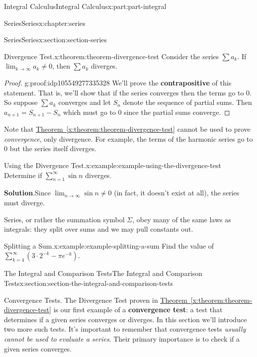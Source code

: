 \documentclass[twoside,10pt,]{book}
\newcommand{\blocktitlefont}{\relax}
\newcommand{\xreffont}{\relax}
\newcommand{\terminology}[1]{\textbf{#1}}
\numberwithin{equation}{part}
\begin{document}
\begin{partptx}{Integral Calculus}{}{Integral Calculus}{}{}{x:part:part-integral}
\begin{chapterptx}{Series}{}{Series}{}{}{x:chapter:series}
\begin{sectionptx}{Series}{}{Series}{}{}{x:section:section-series}
\begin{theorem}{Divergence Test.}{}{x:theorem:theorem-divergence-test}%
Consider the series \(\sum a_{k}\). If \(\lim_{k\to\infty}a_{k}\neq0\), then \(\sum a_{k}\) diverges.%
\end{theorem}
\begin{proof}{}{g:proof:idp105549277335328}
We'll prove the \terminology{contrapositive} of this statement. That is, we'll show that if the series converges then the terms go to \(0\). So suppose \(\sum a_{k}\) converges and let \(S_{n}\) denote the sequence of partial sums. Then \(a_{n+1} = S_{n+1} - S_{n}\) which must go to \(0\) since the partial sums converge.%
\end{proof}
Note that \hyperref[x:theorem:theorem-divergence-test]{Theorem~{\xreffont\ref{x:theorem:theorem-divergence-test}}} cannot be used to prove \emph{convergence}, only divergence. For example, the terms of the harmonic series go to \(0\) but the series itself diverges.%
\begin{example}{Using the Divergence Test.}{x:example:example-using-the-divergence-test}%
Determine if \(\sum_{n=1}^{\infty}\sin n\) diverges.%
\par\smallskip%
\noindent\textbf{\blocktitlefont Solution}.\hypertarget{g:solution:idp105549277275296}{}\quad{}Since \(\lim_{n\to\infty}\sin n\neq 0\) (in fact, it doesn't exist at all), the series must diverge.%
\end{example}
Series, or rather the summation symbol \(\Sigma\), obey many of the same laws as integrals: they split over sums and we may pull constants out.%
\begin{example}{Splitting a Sum.}{x:example:example-splitting-a-sum}%
Find the value of \(\sum_{k=4}^{\infty}\left(3\cdot2^{-k} - \pi e^{-k}\right)\).%
\end{example}
\end{sectionptx}
%
%
\typeout{************************************************}
\typeout{************************************************}
%
\begin{sectionptx}{The Integral and Comparison Tests}{}{The Integral and Comparison Tests}{}{}{x:section:section-the-integral-and-comparison-tests}
\begin{introduction}{Convergence Tests.}%
The Divergence Test proven in \hyperref[x:theorem:theorem-divergence-test]{Theorem~{\xreffont\ref{x:theorem:theorem-divergence-test}}} is our first example of a \terminology{convergence test}: a test that determines if a given series converges or diverges. In this section we'll introduce two more such tests. It's important to remember that convergence tests \emph{usually cannot be used to evaluate a series}. Their primary importance is to check if a given series converges.%

\end{introduction}
\end{sectionptx}
\end{chapterptx}
\end{partptx}
\end{document}
